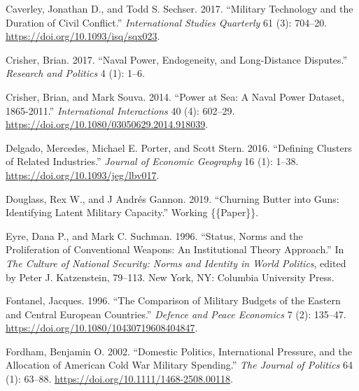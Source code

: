 \documentclass[
]{article}
\newlength{\cslhangindent}
\newlength{\cslentryspacingunit} %
\newenvironment{CSLReferences}[2] %
 {%
  \setlength{\parindent}{0pt}
  \ifodd #1
  \let\oldpar\par
  \def\par{\hangindent=\cslhangindent\oldpar}
  \fi
  \setlength{\parskip}{#2\cslentryspacingunit}
 }%
 {}
\begin{document}
\begin{CSLReferences}{1}{0}
\leavevmode{}%
Caverley, Jonathan D., and Todd S. Sechser. 2017. {``Military {Technology} and the {Duration} of {Civil Conflict}.''} \emph{International Studies Quarterly} 61 (3): 704--20. \url{https://doi.org/10.1093/isq/sqx023}.

\leavevmode{}%
Crisher, Brian. 2017. {``Naval Power, Endogeneity, and Long-Distance Disputes.''} \emph{Research and Politics} 4 (1): 1--6.

\leavevmode{}%
Crisher, Brian, and Mark Souva. 2014. {``Power at {Sea}: {A Naval Power Dataset}, 1865-2011.''} \emph{International Interactions} 40 (4): 602--29. \url{https://doi.org/10.1080/03050629.2014.918039}.

\leavevmode{}%
Delgado, Mercedes, Michael E. Porter, and Scott Stern. 2016. {``Defining Clusters of Related Industries.''} \emph{Journal of Economic Geography} 16 (1): 1--38. \url{https://doi.org/10.1093/jeg/lbv017}.

\leavevmode{}%
Douglass, Rex W., and J Andrés Gannon. 2019. {``Churning {Butter} into {Guns}: {Identifying Latent Military Capacity}.''} Working \{\{Paper\}\}.

\leavevmode{}%
Eyre, Dana P., and Mark C. Suchman. 1996. {``Status, {Norms} and the {Proliferation} of {Conventional Weapons}: {An Institutional Theory Approach}.''} In \emph{The {Culture} of {National Security}: {Norms} and {Identity} in {World Politics}}, edited by Peter J. Katzenstein, 79--113. {New York, NY}: {Columbia University Press}.

\leavevmode{}%
Fontanel, Jacques. 1996. {``The Comparison of Military Budgets of the Eastern and Central {European} Countries.''} \emph{Defence and Peace Economics} 7 (2): 135--47. \url{https://doi.org/10.1080/10430719608404847}.

\leavevmode{}%
Fordham, Benjamin O. 2002. {``Domestic {Politics}, {International Pressure}, and the {Allocation} of {American Cold War Military Spending}.''} \emph{The Journal of Politics} 64 (1): 63--88. \url{https://doi.org/10.1111/1468-2508.00118}.


\end{CSLReferences}
\end{document}

